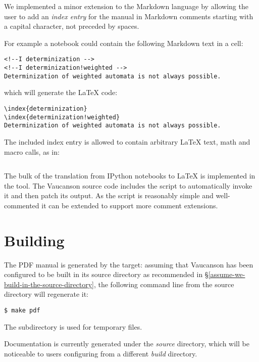 We implemented a minor extension to the Markdown language by allowing
the user to add an \textit{index entry} for the manual in Markdown
comments starting with a capital  character, not preceded by
spaces.

For example a notebook could contain the following Markdown text in a cell:
\begin{verbatim}
<!--I determinization -->
<!--I determinization!weighted -->
Determinization of weighted automata is not always possible.
\end{verbatim}
which will generate the \LaTeX{} code:
\begin{verbatim}
\index{determinization}
\index{determinization!weighted}
Determinization of weighted automata is not always possible.
\end{verbatim}

The included index entry is allowed to contain arbitrary \LaTeX{}
text, math and macro calls, as in:
\begin{verbatim}

\end{verbatim}

The bulk of the translation from IPython notebooks to \LaTeX{} is implemented
in the  tool.  The Vaucanson source code
includes the script  to automatically
invoke it and then patch its output.  As the script is reasonably simple
and well-commented it can be extended to support more comment
extensions.

\section{Building}
The PDF manual is generated by the  target: assuming that
Vaucanson has been configured to be built in its source directory as
recommended in §\ref{assume-we-build-in-the-source-directory}, the
following command line from the source directory will regenerate it:\
\begin{verbatim}
$ make pdf
\end{verbatim}
The subdirectory  is used for temporary
files.

Documentation is currently generated under the \textit{source}
directory, which will be noticeable to users configuring from a
different \textit{build} directory.
